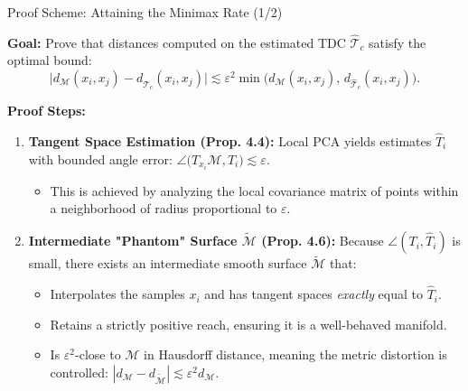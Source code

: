 \documentclass[9pt]{beamer}
\begin{document}
\begin{frame}{Proof Scheme: Attaining the Minimax Rate (1/2)}

\textbf{Goal:} Prove that distances computed on the estimated TDC $\widehat{\mathscr{T}}_c$ satisfy the optimal bound: 
$$\bigl| d_{\mathcal{M}}(x_i,x_j)- d_{\widehat{\mathscr{T}}_c}(x_i,x_j)\bigr| \lesssim \varepsilon^2 \min\!\bigl(d_{\mathcal{M}}(x_i,x_j),\, d_{\widehat{\mathscr{T}}_c}(x_i,x_j)\bigr).$$

\medskip
\textbf{Proof Steps:}
\begin{enumerate}
  \item \textbf{Tangent Space Estimation (Prop. 4.4):} Local PCA yields estimates $\widehat T_i$ with bounded angle error: $\angle\!\bigl(T_{x_i}\mathcal{M}, \widehat T_i\bigr) \lesssim \varepsilon$.
  \begin{itemize}
      \item This is achieved by analyzing the local covariance matrix of points within a neighborhood of radius proportional to $\varepsilon$.
  \end{itemize}
  
  \vspace{0.3cm}
  \item \textbf{Intermediate "Phantom" Surface $\widetilde{\mathcal{M}}$ (Prop. 4.6):} Because $\angle(T_i, \widehat{T}_i)$ is small, there exists an intermediate smooth surface $\widetilde{\mathcal{M}}$ that:
  \begin{itemize}
      \item Interpolates the samples $x_i$ and has tangent spaces \textit{exactly} equal to $\widehat{T}_i$.
      \item Retains a strictly positive reach, ensuring it is a well-behaved manifold.
      \item Is $\varepsilon^2$-close to $\mathcal{M}$ in Hausdorff distance, meaning the metric distortion is controlled: $|d_{\mathcal{M}} - d_{\widetilde{\mathcal{M}}}| \lesssim \varepsilon^2 d_{\mathcal{M}}$.
  \end{itemize}
\end{enumerate}
\end{frame}
\end{document}
